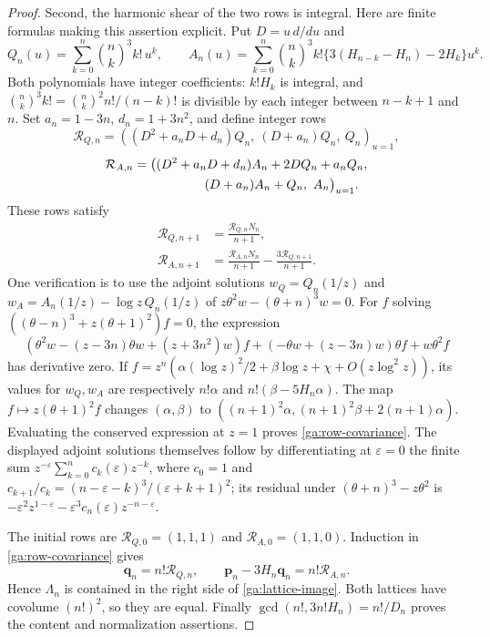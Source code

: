 \documentclass[11pt,a4paper]{article}
\numberwithin{equation}{section}
\theoremstyle{definition}
\theoremstyle{remark}
\begin{document}
\begin{proof}
Second, the harmonic shear of the two rows is integral.
Here are finite formulas making this assertion explicit.  Put
$D=u\,d/du$ and
\[
 Q_n(u)=\sum_{k=0}^n\binom nk^3 k!\,u^k,\qquad
 A_n(u)=\sum_{k=0}^n\binom nk^3 k!
          \{3(H_{n-k}-H_n)-2H_k\}u^k.
\]
Both polynomials have integer coefficients:
$k!H_k$ is integral, and
$\binom nk^3k!=\binom nk^2n!/(n-k)!$
is divisible by each integer between $n-k+1$ and $n$.
Set $a_n=1-3n$, $d_n=1+3n^2$, and define integer rows
\[
 \mathcal R_{Q,n}
 =\left((D^2+a_nD+d_n)Q_n,\ (D+a_n)Q_n,\ Q_n\right)_{u=1},
\]
\begin{equation}\label{ga:rowA}
\begin{split}
 \mathcal R_{A,n}={}&
 \bigl((D^2+a_nD+d_n)A_n+2DQ_n+a_nQ_n,\\
 &\hspace{15mm}(D+a_n)A_n+Q_n,\ A_n\bigr)_{u=1}.
\end{split}
\end{equation}
These rows satisfy
\begin{equation}\label{ga:row-covariance}
\begin{split}
 \mathcal R_{Q,n+1}&=\frac{\mathcal R_{Q,n}N_n}{n+1},\\
 \mathcal R_{A,n+1}&=\frac{\mathcal R_{A,n}N_n}{n+1}
                  -\frac{3\mathcal R_{Q,n+1}}{n+1}.
\end{split}
\end{equation}
One verification is to use the adjoint solutions
$w_Q=Q_n(1/z)$ and
$w_A=A_n(1/z)-\log z\,Q_n(1/z)$ of
$z\theta^2w-(\theta+n)^3w=0$.
For $f$ solving $((\theta-n)^3+z(\theta+1)^2)f=0$,
the expression
\[
 (\theta^2w-(z-3n)\theta w+(z+3n^2)w)f
 +(-\theta w+(z-3n)w)\theta f+w\theta^2f
\]
has derivative zero.  If
$f=z^n(\alpha(\log z)^2/2+\beta\log z+\chi+O(z\log^2z))$,
its values for $w_Q,w_A$ are respectively
$n!\alpha$ and $n!(\beta-5H_n\alpha)$.
The map $f\mapsto z(\theta+1)^2f$ changes
$(\alpha,\beta)$ to
$((n+1)^2\alpha,(n+1)^2\beta+2(n+1)\alpha)$.
Evaluating the conserved expression at $z=1$ proves
\eqref{ga:row-covariance}.
The displayed adjoint solutions themselves follow by differentiating
at $\varepsilon=0$ the finite sum
$z^{-\varepsilon}\sum_{k=0}^nc_k(\varepsilon)z^{-k}$, where
$c_0=1$ and
$c_{k+1}/c_k=(n-\varepsilon-k)^3/(\varepsilon+k+1)^2$;
its residual under $(\theta+n)^3-z\theta^2$ is
$-\varepsilon^2z^{1-\varepsilon}
 -\varepsilon^3c_n(\varepsilon)z^{-n-\varepsilon}$.

The initial rows are
$\mathcal R_{Q,0}=(1,1,1)$ and
$\mathcal R_{A,0}=(1,1,0)$.
Induction in \eqref{ga:row-covariance} gives
\[
 \mathbf q_n=n!\mathcal R_{Q,n},\qquad
 \mathbf p_n-3H_n\mathbf q_n=n!\mathcal R_{A,n}.
\]
Hence $\Lambda_n$ is contained in the right side of
\eqref{ga:lattice-image}.  Both lattices have covolume $(n!)^2$,
so they are equal.  Finally
$\gcd(n!,3n!H_n)=n!/D_n$ proves the content and normalization
assertions.
\end{proof}
\end{document}
